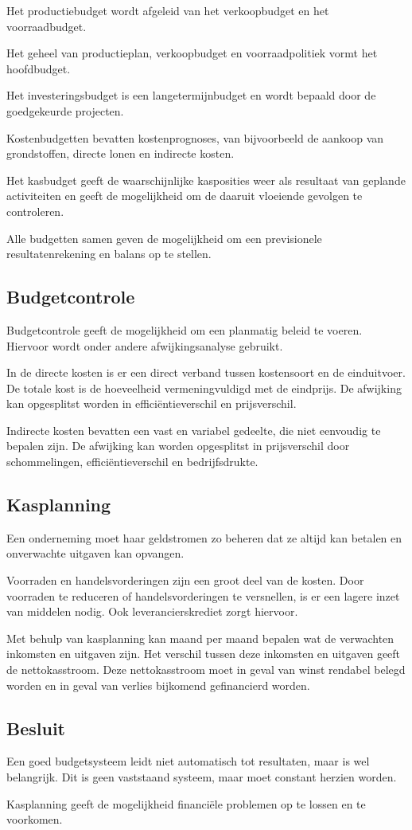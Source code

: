 \documentclass[../../samenvatting.tex]{subfiles}
\begin{document}
Het productiebudget wordt afgeleid van het verkoopbudget en het voorraadbudget.

Het geheel van productieplan, verkoopbudget en voorraadpolitiek vormt het hoofdbudget.

Het investeringsbudget is een langetermijnbudget en wordt bepaald door de goedgekeurde projecten.

Kostenbudgetten bevatten kostenprognoses, van bijvoorbeeld de aankoop van grondstoffen, directe lonen en indirecte kosten.

Het kasbudget geeft de waarschijnlijke kasposities weer als resultaat van geplande activiteiten en geeft de mogelijkheid om de daaruit vloeiende gevolgen te controleren.

Alle budgetten samen geven de mogelijkheid om een previsionele resultatenrekening en balans op te stellen.

\subsection{Budgetcontrole}

Budgetcontrole geeft de mogelijkheid om een planmatig beleid te voeren. Hiervoor wordt onder andere afwijkingsanalyse gebruikt.

In de directe kosten is er een direct verband tussen kostensoort en de einduitvoer. De totale kost is de hoeveelheid vermeningvuldigd met de eindprijs. De afwijking kan opgesplitst worden in efficiëntieverschil en prijsverschil.

Indirecte kosten bevatten een vast en variabel gedeelte, die niet eenvoudig te bepalen zijn. De afwijking kan worden opgesplitst in prijsverschil door schommelingen, efficiëntieverschil en bedrijfsdrukte.

\subsection{Kasplanning}
Een onderneming moet haar geldstromen zo beheren dat ze altijd kan betalen en onverwachte uitgaven kan opvangen.

Voorraden en handelsvorderingen zijn een groot deel van de kosten. Door voorraden te reduceren of handelsvorderingen te versnellen, is er een lagere inzet van middelen nodig. Ook leverancierskrediet zorgt hiervoor.

Met behulp van kasplanning kan maand per maand bepalen wat de verwachten inkomsten en uitgaven zijn. Het verschil tussen deze inkomsten en uitgaven geeft de nettokasstroom. Deze nettokasstroom moet in geval van winst rendabel belegd worden en in geval van verlies bijkomend gefinancierd worden.

\subsection{Besluit}
Een goed budgetsysteem leidt niet automatisch tot resultaten, maar is wel belangrijk. Dit is geen vaststaand systeem, maar moet constant herzien worden.

Kasplanning geeft de mogelijkheid financiële problemen op te lossen en te voorkomen.
\end{document}
